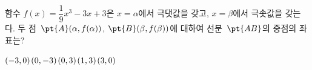 함수 $f(x)=\dfrac{1}{9}x^3-3x+3$은 $x=\alpha$에서 극댓값을 갖고, $x=\beta$에서 극솟값을 갖는다. 두 점~$\pt{A}(\alpha{,}\mkern3mu\mathopen{}f(\alpha))$, $\pt{B}(\beta{,}\mkern3mu\mathopen{}f(\beta))$에 대하여 선분~$\pt{AB}$의 중점의 좌표는?
\begin{choices32}{$(-3{,}\mkern3mu\mathopen{}0)$}{$(0{,}\mkern3mu\mathopen{}-3)$}{$(0{,}\mkern3mu\mathopen{}3)$}{$(1{,}\mkern3mu\mathopen{}3)$}{$(3{,}\mkern3mu\mathopen{}0)$}\end{choices32}

